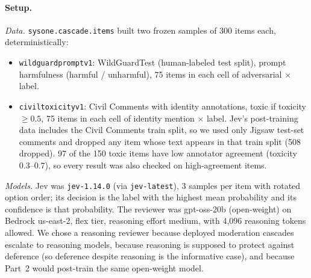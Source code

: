 \documentclass[11pt]{article}
\renewcommand{\_}{\origunderscore\allowbreak}
\begin{document}
\paragraph{Setup.}
\emph{Data.} \texttt{sysone.cascade.items} built two frozen samples of 300 items each, deterministically:
\begin{itemize}[nosep]
  \item \texttt{wildguard\_prompt\_v1}: WildGuardTest (human-labeled test split), prompt harmfulness (harmful / unharmful), 75 items in each cell of adversarial $\times$ label.
  \item \texttt{civil\_toxicity\_v1}: Civil Comments with identity annotations, toxic if toxicity $\geq 0.5$, 75 items in each cell of identity mention $\times$ label. Jev's post-training data includes the Civil Comments train split, so we used only Jigsaw test-set comments and dropped any item whose text appears in that train split (508 dropped). 97 of the 150 toxic items have low annotator agreement (toxicity 0.3--0.7), so every result was also checked on high-agreement items.
\end{itemize}
\emph{Models.} Jev was \texttt{jev-1.14.0} (via \texttt{jev-latest}), 3 samples per item with rotated option order; its decision is the label with the highest mean probability and its confidence is that probability. The reviewer was gpt-oss-20b (open-weight) on Bedrock us-east-2, flex tier, reasoning effort medium, with 4,096 reasoning tokens allowed. We chose a reasoning reviewer because deployed moderation cascades escalate to reasoning models, because reasoning is supposed to protect against deference (so deference despite reasoning is the informative case), and because Part~2 would post-train the same open-weight model.
\end{document}
